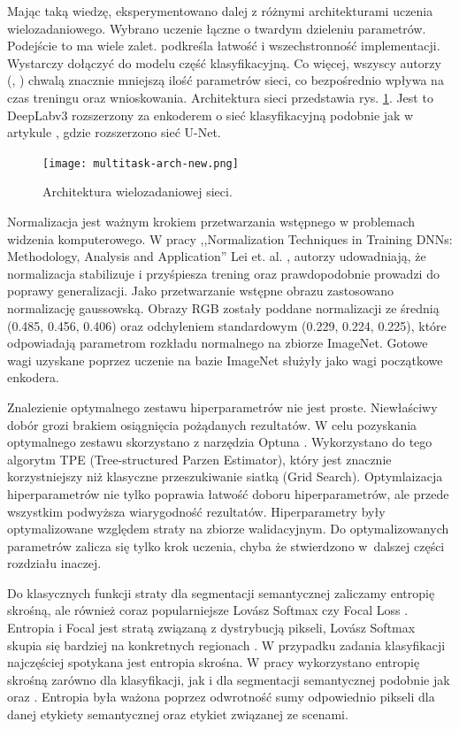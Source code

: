 Mając taką wiedzę, eksperymentowano dalej z różnymi architekturami uczenia wielozadaniowego. Wybrano uczenie łączne o twardym dzieleniu parametrów. Podejście to ma wiele zalet. \cite{mehta2018net} podkreśla łatwość i wszechstronność implementacji. Wystarczy dołączyć do modelu część klasyfikacyjną. Co więcej, wszyscy autorzy (\cite{mehta2018net}, \cite{9892852}) chwalą znacznie mniejszą ilość parametrów sieci, co bezpośrednio wpływa na czas treningu oraz wnioskowania. Architektura sieci przedstawia rys. \ref{fig:multitask}. Jest to DeepLabv3 rozszerzony za enkoderem o sieć klasyfikacyjną podobnie jak w artykule \cite{mehta2018net}, gdzie rozszerzono sieć U-Net.

\begin{figure}[ht!]
\centering
\texttt{[image: multitask-arch-new.png]}
\caption{Architektura wielozadaniowej sieci.}
\label{fig:multitask}
\end{figure}

Normalizacja jest ważnym krokiem przetwarzania wstępnego w problemach widzenia komputerowego. W pracy ,,Normalization Techniques in Training DNNs: Methodology, Analysis and Application'' Lei et. al. \cite{huang2020normalization}, autorzy udowadniają, że normalizacja stabilizuje i przyśpiesza trening oraz prawdopodobnie prowadzi do poprawy generalizacji. Jako przetwarzanie wstępne obrazu zastosowano normalizację gaussowską. Obrazy RGB zostały poddane normalizacji ze średnią (0.485, 0.456, 0.406) oraz odchyleniem standardowym (0.229, 0.224, 0.225), które odpowiadają parametrom rozkładu normalnego na zbiorze ImageNet. Gotowe wagi uzyskane poprzez uczenie na bazie ImageNet służyły jako wagi początkowe enkodera.

Znalezienie optymalnego zestawu hiperparametrów nie jest proste. Niewłaściwy dobór grozi brakiem osiągnięcia pożądanych rezultatów. W celu pozyskania optymalnego zestawu skorzystano z narzędzia Optuna \cite{optuna_2019}. Wykorzystano do tego algorytm TPE (Tree-structured Parzen Estimator), który jest znacznie korzystniejszy niż klasyczne przeszukiwanie siatką (Grid Search). Optymlaizacja hiperparametrów nie tylko poprawia łatwość doboru hiperparametrów, ale przede wszystkim podwyższa wiarygodność rezultatów. Hiperparametry były optymalizowane względem straty na zbiorze walidacyjnym. Do optymalizowanych parametrów zalicza się tylko krok uczenia, chyba że stwierdzono w~dalszej części rozdziału inaczej.

Do klasycznych funkcji straty dla segmentacji semantycznej zaliczamy entropię skrośną, ale również coraz popularniejsze Lov\'asz Softmax \cite{berman2018lovasz} czy Focal Loss \cite{jadon2020survey}. Entropia i Focal jest stratą związaną z dystrybucją pikseli, Lov\'asz Softmax skupia się bardziej na konkretnych regionach \cite{jadon2020survey}. W przypadku zadania klasyfikacji najczęściej spotykana jest entropia skrośna. W pracy wykorzystano entropię skrośną zarówno dla klasyfikacji, jak i dla segmentacji semantycznej podobnie jak \cite{mehta2018net} oraz \cite{9892852}. Entropia była ważona poprzez odwrotność sumy odpowiednio pikseli dla danej etykiety semantycznej oraz etykiet związanej ze scenami.

